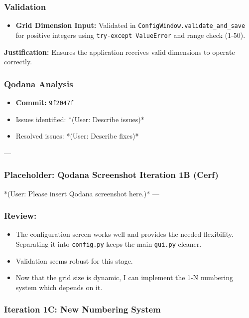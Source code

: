 \subsubsection{Validation}
\begin{itemize}
	\item \textbf{Grid Dimension Input:} Validated in \verb|ConfigWindow.validate_and_save| for positive integers using \verb|try-except ValueError| and range check (1-50).
\end{itemize}
\textbf{Justification:} Ensures the application receives valid dimensions to operate correctly.

\subsubsection{Qodana Analysis}
\begin{itemize}
	\item \textbf{Commit:} \verb|9f2047f|
	\item Issues identified: *(User: Describe issues)*
	\item Resolved issues: *(User: Describe fixes)*
\end{itemize}

--- %
\subsubsection*{Placeholder: Qodana Screenshot Iteration 1B (Cerf)}
*(User: Please insert Qodana screenshot here.)*
---

\subsubsection{Review:}
\begin{itemize}
	\item The configuration screen works well and provides the needed flexibility. Separating it into \verb|config.py| keeps the main \verb|gui.py| cleaner.
	\item Validation seems robust for this stage.
	\item Now that the grid size is dynamic, I can implement the 1-N numbering system which depends on it.
\end{itemize}

\newpage

\subsubsection{Iteration 1C: New Numbering System}

